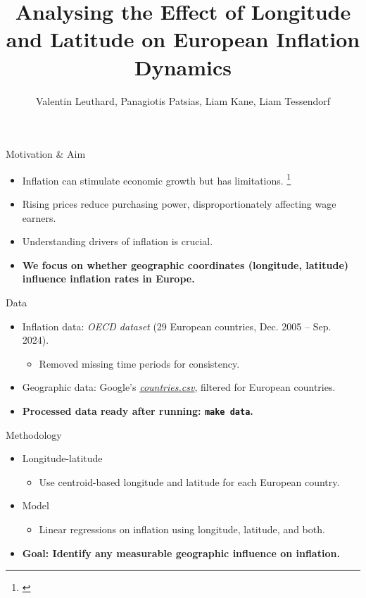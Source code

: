 \documentclass[10pt]{beamer}
\title{Analysing the Effect of Longitude and Latitude on European Inflation Dynamics}
\author{Valentin Leuthard, Panagiotis Patsias, Liam Kane, Liam Tessendorf}
\begin{document}
\begin{frame}
  \titlepage
\end{frame}

\begin{frame}{Motivation \& Aim}
  \begin{itemize}
    \item Inflation can stimulate economic growth but has limitations. \footnote{\cite{TheEffectofInflationonEconomicDevelopment}}

    \item Rising prices reduce purchasing power, disproportionately affecting wage earners. \footnotemark[1]

    \item Understanding drivers of inflation is crucial.
    \vspace{1em}
    \item \textbf{We focus on whether geographic coordinates (longitude, latitude) influence inflation rates in Europe.}
  \end{itemize}
\end{frame}

\begin{frame}{Data}
  \begin{itemize}
    \item Inflation data: \emph{OECD dataset} (29 European countries, Dec. 2005 – Sep. 2024).
    \begin{itemize}    
        \item Removed missing time periods for consistency.
    \end{itemize}
    \item Geographic data: Google’s \href{https://developers.google.com/public-data/docs/canonical/countries_csv}{\emph{countries.csv}}, filtered for European countries.
    \vspace{1em}
    \item \textbf{Processed data ready after running: \texttt{make data}.}
  \end{itemize}
\end{frame}

\begin{frame}{Methodology}
  \begin{itemize}
    \item Longitude-latitude
    \begin{itemize}
        \item Use centroid-based longitude and latitude for each European country.
    \end{itemize}
    \item Model
    \begin{itemize}
        \item Linear regressions on inflation using longitude, latitude, and both.
    \end{itemize}
    \vspace{1em}
    \item \textbf{Goal: Identify any measurable geographic influence on inflation.}
  \end{itemize}
\end{frame}
\end{document}

